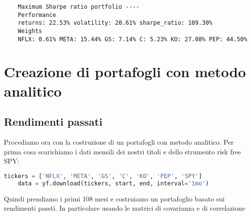 \documentclass{report}
\begin{document}
\begin{lstlisting}
    Maximum Sharpe ratio portfolio ----
    Performance
    returns: 22.53% volatility: 20.61% sharpe_ratio: 109.30% 
    Weights
    NFLX: 0.61% META: 15.44% GS: 7.14% C: 5.23% KO: 27.08% PEP: 44.50% 
\end{lstlisting}
\section{Creazione di portafogli con metodo analitico}
\subsection{Rendimenti passati}
Procediamo ora con la costruzione di un portafogli con metodo analitico.
Per prima cosa scarichiamo i dati mensili dei nostri titoli e dello strumento risk free SPY:
\begin{lstlisting}[language=python]
    tickers = ['NFLX', 'META', 'GS', 'C', 'KO', 'PEP', 'SPY']
    data = yf.download(tickers, start, end, interval='1mo')
\end{lstlisting}
Quindi prendiamo i primi 108 mesi e costruiamo un portafoglio basato sui rendimenti passti. In particolare usando le matrici di covarianza e di correlazione
\end{document}
